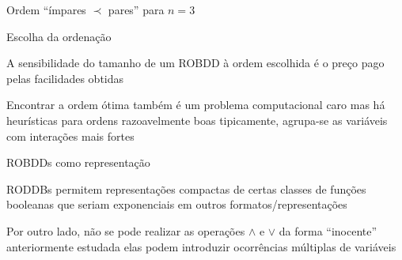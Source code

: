 \expandafter\documentclass\expandafter[table, usenames, svgnames, dvipsnames,14pt, \classopts]{beamer}
\begin{document}
\begin{frame}{Ordem ``ímpares $\prec$ pares'' para $n=3$}
\begin{figure}

    \end{figure}

\end{frame}

\begin{frame}{Escolha da ordenação}

    \begin{outline}
        \1 A sensibilidade do tamanho de um ROBDD à ordem escolhida é o preço pago pelas facilidades obtidas
        
        \vspace{1em}
        
        \1 Encontrar a ordem ótima também é um problema computacional caro
            \2[-] mas há heurísticas para ordens razoavelmente boas
            \2[-] tipicamente, agrupa-se as variáveis com interações mais fortes
            
    \end{outline}

\end{frame}

\begin{frame}{ROBDDs como representação}

    \begin{outline}
        \1 RODDBs permitem representações compactas de certas classes de funções booleanas
            \2[-] que seriam exponenciais em outros formatos/representações
            
        \vspace{1em}
        
        \1 Por outro lado, não se pode realizar as operações $\land$ e $\lor$ da forma ``inocente'' anteriormente estudada
            \2[-] elas podem introduzir ocorrências múltiplas de variáveis
    \end{outline}

\end{frame}
\end{document}
